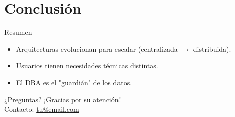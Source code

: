 \documentclass{beamer}
\begin{document}
\section{Conclusión}
\begin{frame}{Resumen}
  \begin{itemize}
    \item Arquitecturas evolucionan para escalar (centralizada $\rightarrow$ distribuida).
    \item Usuarios tienen necesidades técnicas distintas.
    \item El DBA es el "guardián" de los datos.
  \end{itemize}
\end{frame}

\begin{frame}{¿Preguntas?}
  \centering
  \Large ¡Gracias por su atención! \\
  \small Contacto: \href{mailto:tu@email.com}{tu@email.com}
\end{frame}
\end{document}
